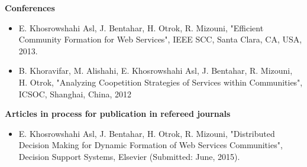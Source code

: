 \textbf{Conferences}

\begin{itemize}
\item E. Khosrowshahi Asl, J. Bentahar, H. Otrok, R. Mizouni, "Efficient Community Formation for Web Services", IEEE SCC, Santa Clara, CA, USA, 2013.

\item B. Khoravifar, M. Alishahi, E. Khosrowshahi Asl, J. Bentahar, R. Mizouni, H. Otrok, "Analyzing Coopetition Strategies of Services within Communities", ICSOC, Shanghai, China, 2012




\end{itemize}

\textbf{Articles in process for publication in refereed journals}

\begin{itemize}
\item E. Khosrowshahi Asl, J. Bentahar, H. Otrok, R. Mizouni, "Distributed Decision Making for Dynamic Formation of Web Services Communities", Decision Support Systems, Elsevier (Submitted: June, 2015).
\end{itemize}

